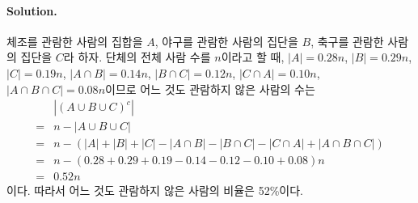 \paragraph{Solution.} 체조를 관람한 사람의 집합을 $A$, 야구를 관람한 사람의 집단을 $B$, 축구를 관람한 사람의 집단을 $C$라 하자. 단체의 전체 사람 수를 $n$이라고 할 때, $\left|A\right| = 0.28n$, $\left|B\right| = 0.29n$, $\left|C\right| = 0.19n$, $\left|A \cap B\right| = 0.14n$, $\left|B \cap C\right| = 0.12n$, $\left|C \cap A\right| = 0.10n$, $\left|A \cap B \cap C\right| = 0.08n$이므로 어느 것도 관람하지 않은 사람의 수는 
	\begin{align*}
		& \left|\left(A \cup B \cup C\right)^c\right| \\
		=& n - \left|A \cup B \cup C\right| \\
		=& n - \left(\left|A\right| + \left|B\right| + \left|C\right| - \left|A\cap B\right| - \left|B\cap C\right| - \left|C\cap A\right| + \left|A \cap B \cap C\right|\right) \\
		=& n - \left(0.28 + 0.29 + 0.19 - 0.14 - 0.12 - 0.10 + 0.08\right)n \\
		=& 0.52n
	\end{align*}
	이다. 따라서 어느 것도 관람하지 않은 사람의 비율은 52\%이다.
